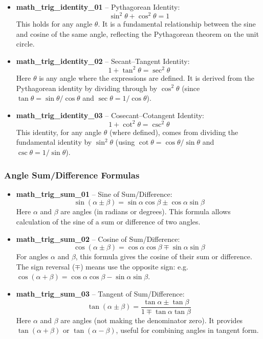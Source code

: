 \documentclass[11pt,a4paper]{article}
\begin{document}
\begin{itemize}
\item \textbf{math\_trig\_identity\_01} -- Pythagorean Identity: 
\[\sin^2\theta + \cos^2\theta = 1\]
This holds for any angle $\theta$. It is a fundamental relationship between the sine and cosine of the same angle, reflecting the Pythagorean theorem on the unit circle.

\item \textbf{math\_trig\_identity\_02} -- Secant--Tangent Identity: 
\[1 + \tan^2\theta = \sec^2\theta\]
Here $\theta$ is any angle where the expressions are defined. It is derived from the Pythagorean identity by dividing through by $\cos^2\theta$ (since $\tan\theta = \sin\theta/\cos\theta$ and $\sec\theta = 1/\cos\theta$).

\item \textbf{math\_trig\_identity\_03} -- Cosecant--Cotangent Identity: 
\[1 + \cot^2\theta = \csc^2\theta\]
This identity, for any angle $\theta$ (where defined), comes from dividing the fundamental identity by $\sin^2\theta$ (using $\cot\theta = \cos\theta/\sin\theta$ and $\csc\theta = 1/\sin\theta$).
\end{itemize}

\subsubsection{Angle Sum/Difference Formulas}

\begin{itemize}
\item \textbf{math\_trig\_sum\_01} -- Sine of Sum/Difference: 
\[\sin(\alpha \pm \beta) = \sin\alpha\cos\beta \pm \cos\alpha\sin\beta\]
Here $\alpha$ and $\beta$ are angles (in radians or degrees). This formula allows calculation of the sine of a sum or difference of two angles.

\item \textbf{math\_trig\_sum\_02} -- Cosine of Sum/Difference: 
\[\cos(\alpha \pm \beta) = \cos\alpha\cos\beta \mp \sin\alpha\sin\beta\]
For angles $\alpha$ and $\beta$, this formula gives the cosine of their sum or difference. The sign reversal ($\mp$) means use the opposite sign: e.g. $\cos(\alpha+\beta) = \cos\alpha\cos\beta - \sin\alpha\sin\beta$.

\item \textbf{math\_trig\_sum\_03} -- Tangent of Sum/Difference: 
\[\tan(\alpha \pm \beta) = \frac{\tan\alpha \pm \tan\beta}{1 \mp \tan\alpha\tan\beta}\]
Here $\alpha$ and $\beta$ are angles (not making the denominator zero). It provides $\tan(\alpha+\beta)$ or $\tan(\alpha-\beta)$, useful for combining angles in tangent form.
\end{itemize}
\end{document}

